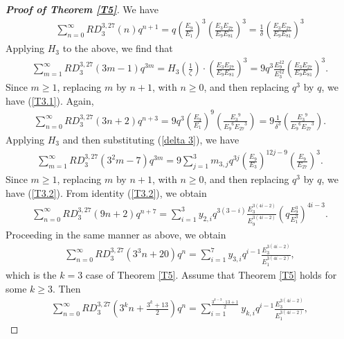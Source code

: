 \documentclass[11pt,a4paper]{article}
\numberwithin{equation}{section}
\theoremstyle{plain}
\begin{document}
	\begin{proof}[\it\textbf{Proof of Theorem \ref{T5}}]
		We have
		\begin{align*}
			\sum_{n=0}^{\infty}RD_3^{3,27}\left(n\right)q^{n+1}=q\left(\frac{E_9}{E_1}\right)^3\left(\frac{{E_3}{E_{27}}}{{E_9}{E_{81}}}\right)^3=\frac{1}{\delta}\left(\frac{{E_3}{E_{27}}}{{E_9}{E_{81}}}\right)^3
		\end{align*}
		Applying $H_3$ to the above, we find that
		\begin{align*}
			\sum_{m=1}^{\infty}RD_3^{3,27}(3m-1)q^{3m}
			= H_{3}\!\left(\frac{1}{\zeta}\right)\cdot\left(\frac{{E_3}{E_{27}}}{{E_9}{E_{81}}}\right)^3
			= 9q^{3}\frac{E_{9}^{12}}{E_{3}^{12}}\left(\frac{{E_3}{E_{27}}}{{E_9}{E_{81}}}\right)^3.
		\end{align*}
		Since \(m \geq 1\), replacing \(m\) by \(n+1\), with \(n \geq 0\), and then replacing \(q^3\) by \(q\), we have (\ref{T3.1}).
		Again,\\
		\begin{align*}
			\sum_{n=0}^{\infty}RD_3^{3,27}\left(3n+2\right)q^{n+3}=9q^3\left(\frac{E_9}{E_1}\right)^9\left(\frac{{E_3}^9}{{E_9}^6{E_{27}}^3}\right)=9\frac{1}{\delta^3}\left(\frac{{E_3}^9}{{E_9}^6{E_{27}}^3}\right).
		\end{align*}
			Applying $H_3$ and then substituting (\ref{delta 3}), we have
			\begin{align*}
				\sum_{m=1}^{\infty}RD_3^{3,27}\left(3^2m-7\right)q^{3m}=9\sum_{j=1}^{3} m_{3,j}q^{3j}\left(\frac{E_9}{E_3}\right)^{12j-9}\left(\frac{E_9}{E_{27}}\right)^3.
			\end{align*}
				Since \(m \geq 1\), replacing \(m\) by \(n+1\), with \(n \geq 0\), and then replacing \(q^3\) by \(q\), we have (\ref{T3.2}).
				From identity (\ref{T3.2}), we obtain
			\begin{align*}
				\sum_{n=0}^{\infty}RD_3^{3,27}\left(9n+2\right)q^{n+7}=\sum_{i=1}^{3}y_{2,i}q^{3(3-i)}\frac{E_3^{3(4i-2)}}{E_9^{3(4i-2)}}\left(q\frac{E_9^3}{E_1^3}\right)^{4i-3}.
			\end{align*}	
		Proceeding in the same manner as above, we obtain
			\begin{align*}
				\sum_{n=0}^{\infty}RD_3^{3,27}\left(3^3n+20\right)q^n=\sum_{i=1}^{7}y_{3,i}q^{i-1}\frac{E_3^{3(4i-2)}}{E_1^{3(4i-2)}},
			\end{align*}
	which is the $k=3$ case of Theorem \ref{T5}.
Assume that Theorem \ref{T5} holds for some $k\geq3$. Then
	\begin{align*}
	\sum_{n=0}^{\infty}RD_3^{3,27}\left(3^kn+\frac{3^k+13}{2}\right)q^n=\sum_{i=1}^{\frac{3^{k-3}\cdot13+1}{2}}y_{k,i}q^{i-1}\frac{E_3^{3(4i-2)}}{E_1^{3(4i-2)}},

\end{align*}
\end{proof}
\end{document}
